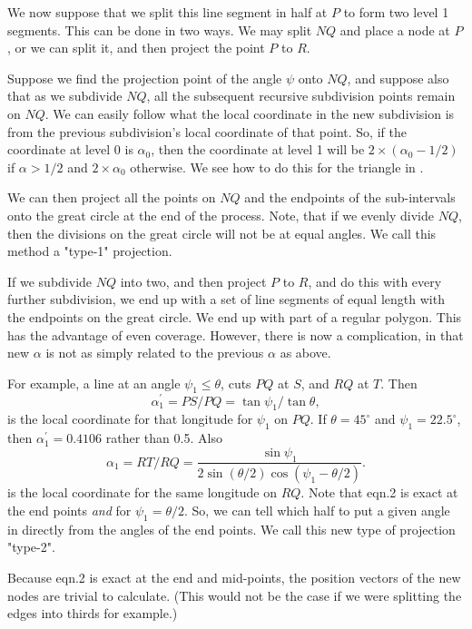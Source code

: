\documentclass[12pt]{article}
\begin{document}
We now suppose that we split this line segment in half at $P$ to form
two level 1 segments. This can be done in two ways. We may split $NQ$
and place a node at $P$, or we can split it, and then project the point 
$P$ to $R$. 

Suppose we find the projection point of the angle $\psi$ onto $NQ$, and
suppose also that as we subdivide $NQ$, all the subsequent recursive subdivision
points remain on $NQ$. We can easily follow what the local coordinate
in the new subdivision is from the previous subdivision's local coordinate
of that point. So, if the coordinate at level 0 is $\alpha_0$, then the
coordinate at level 1 will be $2 \times (\alpha_0-1/2)$ if $\alpha > 1/2$
and $2 \times \alpha_0$ otherwise. We see how to do this
for the triangle in .

We can then project all the points
on $NQ$ and the endpoints of the sub-intervals onto the great circle 
at the end of the process. Note, that if we evenly divide $NQ$, then the
divisions on the great circle will not be at equal angles. We call this
method a "type-1" projection.

If we subdivide $NQ$ into two, and then project $P$ to $R$, and do this
with every further subdivision, we end up with a set of line segments
of equal length with the endpoints on the great circle. We end up with
part of a regular polygon. This has the advantage of even coverage.
However, there is now a complication, in that new $\alpha$ is not
as simply related to the previous $\alpha$ as above.

For example, a line
at an angle $\psi_1 \le \theta$,  cuts
$PQ$  at $S$, and $RQ$ at $T$. Then
\begin{equation}
\alpha_1^\prime=PS/PQ =\tan \psi_1 /  \tan \theta,
\end{equation}
is the local coordinate for that longitude for $\psi_1$ on $PQ$.
If $\theta=45^\circ$ and  $\psi_1=22.5^\circ$, then $\alpha_1^\prime=0.4106$
 rather than 0.5. 
Also
\begin{equation}
\alpha_1=RT/RQ= \frac{ \sin \psi_1 }{2 \sin (\theta/2)  \cos(\psi_1-\theta/2)}.
\end{equation}
is the local coordinate for the same longitude on $RQ$.
Note that eqn.2 is exact at the end points {\it and} for $\psi_1=\theta/2$. 
So, we can tell which half to put a given angle in directly
from the angles of the end points.
We call this new type of projection "type-2".

Because eqn.2 is exact at
the end and mid-points, the position vectors of the new nodes are trivial
to calculate. (This would not be the case if we were splitting the edges 
into thirds for example.)
\end{document}
